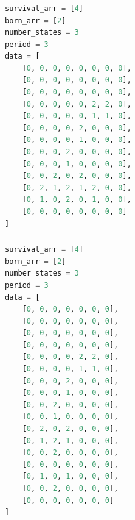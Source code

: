 \documentclass[12pt]{article}
\numberwithin{figure}{section} %
\begin{document}
\noindent\begin{minipage}{.5\textwidth}
\subsubsection{}
\begin{lstlisting}[language = Python]
survival_arr = [4]
born_arr = [2]
number_states = 3
period = 3 
data = [
    [0, 0, 0, 0, 0, 0, 0, 0],
    [0, 0, 0, 0, 0, 0, 0, 0],
    [0, 0, 0, 0, 0, 0, 0, 0],
    [0, 0, 0, 0, 0, 2, 2, 0],
    [0, 0, 0, 0, 0, 1, 1, 0],
    [0, 0, 0, 0, 2, 0, 0, 0],
    [0, 0, 0, 0, 1, 0, 0, 0],
    [0, 0, 0, 2, 0, 0, 0, 0],
    [0, 0, 0, 1, 0, 0, 0, 0],
    [0, 0, 2, 0, 2, 0, 0, 0],
    [0, 2, 1, 2, 1, 2, 0, 0],
    [0, 1, 0, 2, 0, 1, 0, 0],
    [0, 0, 0, 0, 0, 0, 0, 0]
]

\end{lstlisting}
\end{minipage}\hfill
\begin{minipage}{.45\textwidth}
\subsubsection{}
\begin{lstlisting}[language = Python]
survival_arr = [4]
born_arr = [2]
number_states = 3
period = 3
data = [
    [0, 0, 0, 0, 0, 0, 0],
    [0, 0, 0, 0, 0, 0, 0],
    [0, 0, 0, 0, 0, 0, 0],
    [0, 0, 0, 0, 0, 0, 0],
    [0, 0, 0, 0, 2, 2, 0],
    [0, 0, 0, 0, 1, 1, 0],
    [0, 0, 0, 2, 0, 0, 0],
    [0, 0, 0, 1, 0, 0, 0],
    [0, 0, 2, 0, 0, 0, 0],
    [0, 0, 1, 0, 0, 0, 0],
    [0, 2, 0, 2, 0, 0, 0],
    [0, 1, 2, 1, 0, 0, 0],
    [0, 0, 2, 0, 0, 0, 0],
    [0, 0, 0, 0, 0, 0, 0],
    [0, 1, 0, 1, 0, 0, 0],
    [0, 0, 2, 0, 0, 0, 0],
    [0, 0, 0, 0, 0, 0, 0]
]
\end{lstlisting}
\end{minipage}
\end{document}

